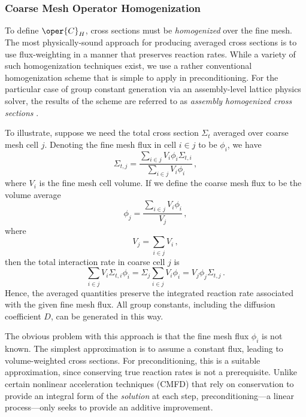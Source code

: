 \subsubsection{Coarse Mesh Operator Homogenization}

To define $\oper{C}_H$, cross sections must be \emph{ homogenized} over 
the fine  mesh.  The most physically-sound approach for producing averaged 
cross sections is to use flux-weighting in a manner that preserves reaction
rates.  While a variety of such homogenization techniques exist, we use 
a rather conventional homogenization scheme that is simple to apply  
in preconditioning.  For the particular case of group constant generation
via an assembly-level lattice physics solver, the results of the scheme are 
referred to as \emph{ assembly homogenized cross sections} \cite{smith1986aht}.

To illustrate, suppose we need the total cross section $\Sigma_t$ averaged 
over coarse mesh cell $j$.  Denoting the fine mesh flux in cell $i \in j$ to 
be $\phi_i$, we have
\begin{equation}
  \Sigma_{t,j} = \frac{ \sum_{i \in j} V_i \phi_i \Sigma_{t, i} }
                      { \sum_{i \in j} V_i \phi_i } \, , 
\end{equation}
where $V_i$ is the fine mesh cell volume. If we define the coarse mesh 
flux to be the volume average
\begin{equation}
 \phi_j = \frac{\sum_{i \in j} V_ i \phi_i} {V_j} \, ,
\end{equation}
where 
\begin{equation}
 V_j = \sum_{i \in j} V_i \, ,
\end{equation}
then the total interaction rate in coarse cell $j$ is
\begin{equation}
 \sum_{i \in j} V_i \Sigma_{t, i} \phi_i =  
    \Sigma_j  \sum_{i \in j} V_i \phi_i =
    V_j \phi_j \Sigma_{t, j} \, .
\end{equation}
Hence, the averaged quantities preserve the integrated reaction
rate associated with the given fine mesh flux.  All group constants,
including the diffusion coefficient $D$, can be generated in this way.

The obvious problem with this approach is that the fine mesh flux 
$\phi_i$ is not known. The simplest approximation is to assume a 
constant flux, leading to  volume-weighted cross sections.  For 
preconditioning,  this is a suitable approximation, since 
conserving true reaction rates is not a prerequisite.  Unlike 
certain nonlinear acceleration techniques (\eg CMFD) that rely on 
conservation to provide an integral form of the \emph{ solution} at 
each step, preconditioning---a linear process---only seeks to provide 
an additive improvement.

